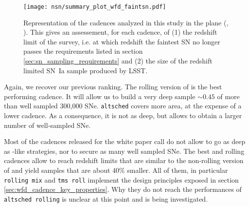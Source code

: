 \begin{sidewaysfigure}
  \begin{center}
    \texttt{[image: nsn/summary\_plot\_wfd\_faintsn.pdf]}
    \caption{Representation of the cadences analyzed in this study in
      the plane (\zfaint, \nsnfaint). This gives an assessement, for
      each cadence, of (1) the redshift limit of the survey, i.e. at
      which redshift the faintest SN no longer passes the requirements
      listed in section \ref{sec:sn_sampling_requirements} and (2) the
      size of the redshift limited SN~Ia sample produced by LSST.}
    \label{fig:nsn_zmax_faint}
  \end{center}
\end{sidewaysfigure}

Again, we recover our previous ranking.  The rolling version of
\altsched is the best performing cadence.  It will allow us to build a
very deep sample \zmed $\sim 0.45$ of more than well sampled 300,000
SNe.  {\tt altsched} covers more area, at the expense of a lower
cadence.  As a consequence, it is not as deep, but allows to obtain a
larger number of well-sampled SNe.

 Most of the cadences released for the white paper call do not allow to
go as deep as \altschednosp-like strategies, nor to secure as many well sampled SNe. The best \opsim and
\slair rolling cadences allow to reach redshift limits that are
similar to the non-rolling version of \altsched and yield samples that
are about 40\% smaller. All of them, in particular {\tt rolling mix}
and {\tt tms roll} implement the design principles exposed in section
\ref{sec:wfd_cadence_key_properties}. Why they do not reach the
performances of {\tt altsched rolling} is unclear at this point and is
being investigated.
